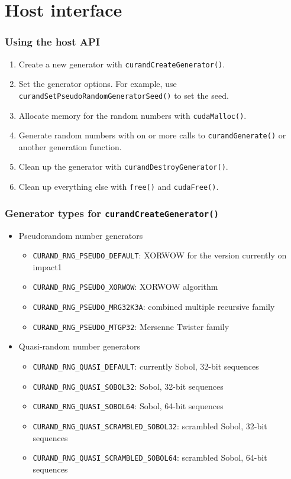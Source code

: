 \documentclass[handout]{beamer}
\numberwithin{equation}{section}
\begin{document}
\section{Host interface}

\begin{frame}
\frametitle{Using the host API}
\begin{enumerate}
\pause \item Create a new generator with {\tt curandCreateGenerator()}.
\pause \item Set the generator options. For example, use {\tt curandSetPseudoRandomGeneratorSeed()} to set the seed.
\pause \item Allocate memory for the random numbers with {\tt cudaMalloc()}.
\pause \item Generate random numbers with on or more calls to {\tt curandGenerate()} or another generation function.
\pause \item Clean up the generator with {\tt curandDestroyGenerator()}.
\pause \item Clean up everything else with {\tt free()} and {\tt cudaFree()}.
\end{enumerate}
\end{frame}

\begin{frame}
\frametitle{Generator types for {\tt curandCreateGenerator()}}
\begin{itemize}
\item Pseudorandom number generators
\begin{itemize}
\pause \item {\tt CURAND\_RNG\_PSEUDO\_DEFAULT}: XORWOW for the version currently on impact1
\pause \item {\tt CURAND\_RNG\_PSEUDO\_XORWOW}: XORWOW algorithm
\pause \item {\tt CURAND\_RNG\_PSEUDO\_MRG32K3A}: combined multiple recursive family
\pause \item {\tt CURAND\_RNG\_PSEUDO\_MTGP32}: Mersenne Twister family
\end{itemize}
\pause \item Quasi-random number generators
\begin{itemize}
\pause \item {\tt CURAND\_RNG\_QUASI\_DEFAULT}: currently Sobol, 32-bit sequences
\pause \item {\tt CURAND\_RNG\_QUASI\_SOBOL32}: Sobol, 32-bit sequences
 \item {\tt CURAND\_RNG\_QUASI\_SOBOL64}: Sobol, 64-bit sequences
\pause \item {\tt CURAND\_RNG\_QUASI\_SCRAMBLED\_SOBOL32}: scrambled Sobol, 32-bit sequences
 \item {\tt CURAND\_RNG\_QUASI\_SCRAMBLED\_SOBOL64}: scrambled Sobol, 64-bit sequences
\end{itemize}
\end{itemize}
\end{frame}
\end{document}
